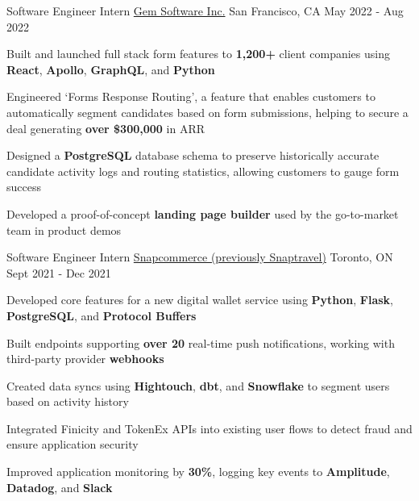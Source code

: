
\begin{cventries}
  \cventry
    {Software Engineer Intern} %
    {\href{https://www.gem.com/}{Gem Software Inc.}} %
    {San Francisco, CA} %
    {May 2022 - Aug 2022} %
    {
      \begin{cvitems} %
      \item {Built and launched full stack form features to \textbf{1,200+} client companies using \textbf{React}, \textbf{Apollo}, \textbf{GraphQL}, and \textbf{Python}}
      \item {Engineered `Forms Response Routing', a feature that enables customers to automatically segment candidates based on form submissions, helping to secure a deal generating \textbf{over \$300,000} in ARR}
      \item {Designed a \textbf{PostgreSQL} database schema to preserve historically accurate candidate activity logs and routing statistics, allowing customers to gauge form success}
      \item {Developed a proof-of-concept \textbf{landing page builder} used by the go-to-market team in product demos}
      \end{cvitems}
    }

  \cventry
    {Software Engineer Intern} %
    {\href{https://www.snapcommerce.com/}{Snapcommerce (previously Snaptravel)}} %
    {Toronto, ON} %
    {Sept 2021 - Dec 2021} %
    {
      \begin{cvitems} %
      \item {Developed core features for a new digital wallet service using \textbf{Python}, \textbf{Flask}, \textbf{PostgreSQL}, and \textbf{Protocol Buffers}}
      \item {Built endpoints supporting \textbf{over 20} real-time push notifications, working with third-party provider \textbf{webhooks}}
      \item {Created data syncs using \textbf{Hightouch}, \textbf{dbt}, and \textbf{Snowflake} to segment users based on activity history}
      \item {Integrated Finicity and TokenEx APIs into existing user flows to detect fraud and ensure application security}
      \item {Improved application monitoring by \textbf{30\%}, logging key events to \textbf{Amplitude}, \textbf{Datadog}, and \textbf{Slack}}
      \end{cvitems}
    }


\end{cventries}
